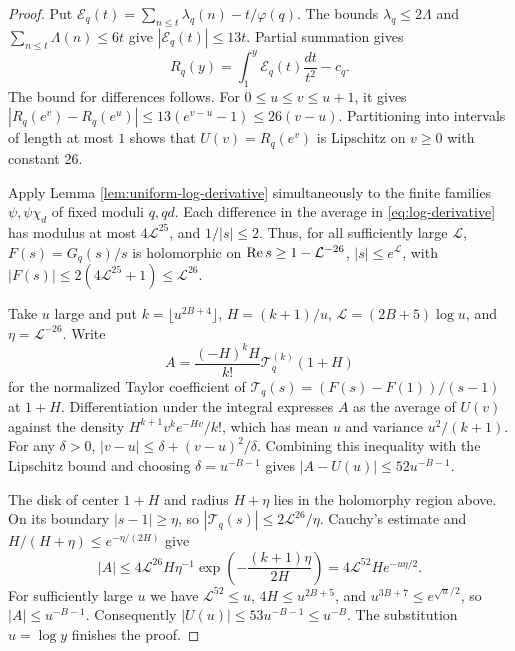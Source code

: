 \begin{proof}
Put \(\mathcal E_q(t)=\sum_{n\le t}\lambda_q(n)-t/\varphi(q)\).
The bounds \(\lambda_q\le2\Lambda\) and \(\sum_{n\le t}\Lambda(n)\le6t\)
give \(|\mathcal E_q(t)|\le13t\). Partial summation gives
\[
 R_q(y)=\int_1^y\mathcal E_q(t)\frac{dt}{t^2}-c_q.
\]
The bound for differences follows. For \(0\le u\le v\le u+1\), it gives
\(|R_q(e^v)-R_q(e^u)|\le13(e^{v-u}-1)\le26(v-u)\). Partitioning into intervals
of length at most \(1\) shows that \(U(v)=R_q(e^v)\) is Lipschitz on \(v\ge0\)
with constant \(26\).

Apply Lemma \ref{lem:uniform-log-derivative} simultaneously to the finite
families \(\psi,\psi\chi_d\) of fixed moduli \(q,qd\). Each difference in the
average in \eqref{eq:log-derivative} has modulus at most \(4\mathcal L^{25}\),
and \(1/|s|\le2\). Thus, for all sufficiently large \(\mathcal L\),
\(F(s)=G_q(s)/s\) is holomorphic on \(\operatorname{Re} s\ge1-\mathcal L^{-26}\),
\(|s|\le e^\mathcal L\), with
\(|F(s)|\le2(4\mathcal L^{25}+1)\le\mathcal L^{26}\).

Take \(u\) large and put \(k=\lfloor u^{2B+4}\rfloor\), \(H=(k+1)/u\),
\(\mathcal L=(2B+5)\log u\), and \(\eta=\mathcal L^{-26}\).
Write
\[
 A=\frac{(-H)^k H}{k!}\mathcal T_q^{(k)}(1+H)
\]
for the normalized Taylor coefficient of
\(\mathcal T_q(s)=(F(s)-F(1))/(s-1)\) at \(1+H\).
Differentiation under the integral expresses \(A\) as the average of \(U(v)\)
against the density \(H^{k+1}v^k e^{-Hv}/k!\), which has mean \(u\) and variance
\(u^2/(k+1)\). For any \(\delta>0\),
\(|v-u|\le\delta+(v-u)^2/\delta\). Combining this inequality with the Lipschitz
bound and choosing \(\delta=u^{-B-1}\) gives \(|A-U(u)|\le52u^{-B-1}\).

The disk of center \(1+H\) and radius \(H+\eta\) lies in the holomorphy region
above. On its boundary \(|s-1|\ge\eta\), so
\(|\mathcal T_q(s)|\le 2\mathcal L^{26}/\eta\). Cauchy's estimate and
\(H/(H+\eta)\le e^{-\eta/(2H)}\) give
\[
 |A|\le4\mathcal L^{26}H\eta^{-1}
       \exp\!\left(-\frac{(k+1)\eta}{2H}\right)
      =4\mathcal L^{52}H e^{-u\eta/2}.
\]
For sufficiently large \(u\) we have \(\mathcal L^{52}\le u\),
\(4H\le u^{2B+5}\), and \(u^{3B+7}\le e^{\sqrt{u}/2}\), so
\(|A|\le u^{-B-1}\). Consequently \(|U(u)|\le53u^{-B-1}\le u^{-B}\).
The substitution \(u=\log y\) finishes the proof.
\end{proof}
